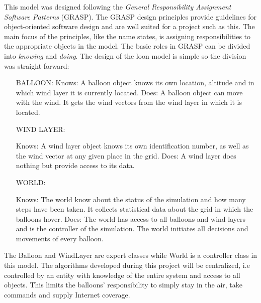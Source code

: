 

This model was designed following the \textit{General Responsibility Assignment Software Patterns} (GRASP). The GRASP design principles provide guidelines for object-oriented software design and are well suited for a project such as this. The main focus of the principles, like the name states, is assigning responsibilities to the appropriate objects in the model. The basic roles in GRASP can be divided into \textit{knowing} and \textit{doing}. The design of the loon model is simple so the division was straight forward:
\begin{itemize}
\item[BALLOON:]
    \subitem Knows: A balloon object knows its own location, altitude and in which wind layer it is currently located.
    \subitem Does: A balloon object can move with the wind. It gets the wind vectors from the wind layer in which it is located. 

\item[WIND LAYER:]

    \subitem Knows: A wind layer object knows its own identification number, as well as the wind vector at any given place in the grid.
    \subitem Does: A wind layer does nothing but provide access to its data.

\item[WORLD:]

    \subitem Knows: The world know about the status of the simulation and how many steps have been taken. It collects statistical data about the grid in which the balloons hover. 
    \subitem Does: The world has access to all balloons and wind layers and is the controller of the simulation. The world initiates all decisions and movements of every balloon. 

\end{itemize}

The Balloon and WindLayer are expert classes while World is a controller class in this model. The algorithms developed during this project will be centralized, i.e controlled by an entity with knowledge of the entire system and access to all objects. This limits the balloons' responsibility to simply stay in the air, take commands and supply Internet coverage.

